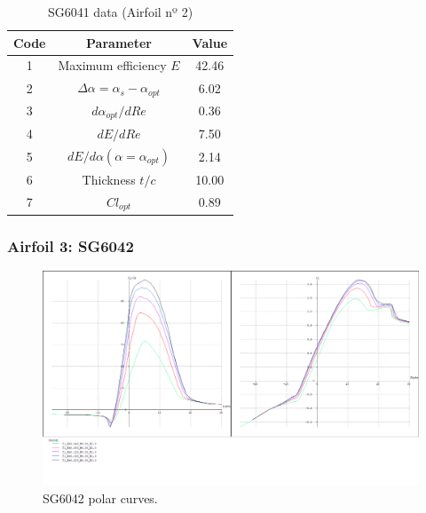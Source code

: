 \documentclass[../TFG_Annex.tex]{subfiles}
\begin{document}
\begin{table}[h!]
	\centering
	\begin{tabular}{c|c|c}
		Code & Parameter                                    & Value  \\ \hline
		1    & Maximum efficiency $E$                      &      42.46           \\
		2    & $\Delta \alpha=\alpha_{s}-\alpha_{opt}$    &            6.02         \\
		3    & ${d\alpha_{opt}}/{dRe}$                     &               0.36    \\
		4    & ${dE}/{dRe}$                                &          7.50          \\
		5    & ${dE}/{d \alpha} (\alpha=\alpha_{opt})$      &        2.14          \\
		6    & Thickness $t/c$                            &           10.00         \\
		7    & $Cl_{opt}$  & 0.89
	\end{tabular}
	\caption{SG6041 data (Airfoil nº 2)}
	\label{tab:Airf2}
\end{table}



\newpage
\subsubsection{Airfoil 3: SG6042}


\begin{figure}[h!]
	\centering
	\includegraphics[width=1\linewidth]{"../../04-Airfoil selection/Imatges airfoils/3-SG6042"}
	\caption{SG6042 polar curves.}
	\label{fig:3-sg6042}
\end{figure}
\end{document}
